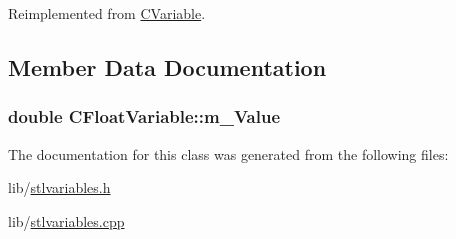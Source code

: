 Reimplemented from \hyperlink{classCVariable_a7c536a5709d8df5d9d75013370288c79}{C\-Variable}.



\subsection{Member Data Documentation}
\hypertarget{classCFloatVariable_aa25bca6796483d1055947eceb2aff411}{
\subsubsection[{m\-\_\-\-Value}]{\setlength{\rightskip}{0pt plus 5cm}double C\-Float\-Variable\-::m\-\_\-\-Value\hspace{0.3cm}{\ttfamily [protected]}}}\label{classCFloatVariable_aa25bca6796483d1055947eceb2aff411}


The documentation for this class was generated from the following files\-:\begin{DoxyCompactItemize}
\item 
lib/\hyperlink{stlvariables_8h}{stlvariables.\-h}\item 
lib/\hyperlink{stlvariables_8cpp}{stlvariables.\-cpp}\end{DoxyCompactItemize}
